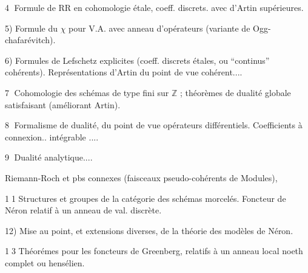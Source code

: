 \normalmarginpar
\textcircled{4} Formule de RR en cohomologie étale, coeff. discrets.
 avec  d'Artin supérieures.

5) Formule du $\chi$ pour V.A. avec anneau d'opérateurs (variante de Ogg-chafarévitch).

6) Formules de Lefschetz explicites (coeff. discrets étales, ou ``continus'' cohérents). Représentations d'Artin du point de vue cohérent....

\textcircled{7} Cohomologie des schémas de type fini sur $\mathbb{Z}$ ; théorèmes de dualité globale satisfaisant (améliorant Artin).

\textcircled{8} Formalisme de dualité, du point de vue opérateurs différentiels. Coefficients à connexion.. intégrable .... 

\textcircled{9} Dualité analytique....

Riemann-Roch et pbs connexes (faisceaux pseudo-cohérents de Modules),  

\textcircled{\small 11} Structures et groupes de la catégorie des schémas morcelés. Foncteur de Néron relatif à un anneau de val. discrète.



\reversemarginpar
{}12)%
\hspace{.4em}Mise au point, et extensions diverses, de la théorie des modèles de Néron. \hfill
\begin{minipage}[c]{1.8em}\end{minipage}

\textcircled{\small 13}%
\hspace{.4em}Théorémes  pour les foncteurs de Greenberg, relatifs à un anneau local noeth complet ou hensélien.

